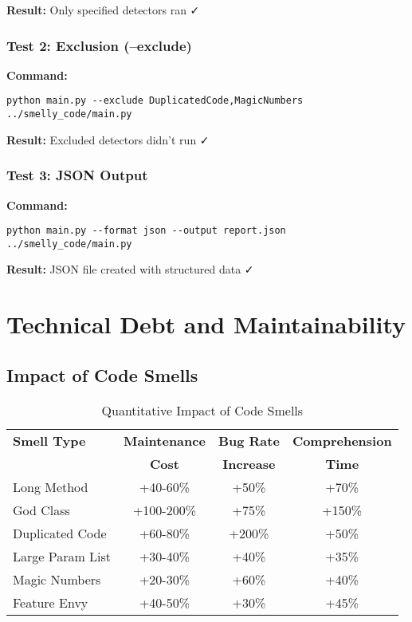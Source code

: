 \documentclass[11pt,a4paper]{article}
\begin{document}
\textbf{Result:} Only specified detectors ran ✓

\subsubsection{Test 2: Exclusion (--exclude)}

\textbf{Command:}
\begin{verbatim}
python main.py --exclude DuplicatedCode,MagicNumbers ../smelly_code/main.py
\end{verbatim}

\textbf{Result:} Excluded detectors didn't run ✓

\subsubsection{Test 3: JSON Output}

\textbf{Command:}
\begin{verbatim}
python main.py --format json --output report.json ../smelly_code/main.py
\end{verbatim}

\textbf{Result:} JSON file created with structured data ✓

\section{Technical Debt and Maintainability}

\subsection{Impact of Code Smells}

\begin{table}[h]
\centering
\caption{Quantitative Impact of Code Smells}
\begin{tabular}{@{}lccc@{}}
\toprule
\textbf{Smell Type} & \textbf{Maintenance} & \textbf{Bug Rate} & \textbf{Comprehension} \\
 & \textbf{Cost} & \textbf{Increase} & \textbf{Time} \\
\midrule
Long Method & +40-60\% & +50\% & +70\% \\
God Class & +100-200\% & +75\% & +150\% \\
Duplicated Code & +60-80\% & +200\% & +50\% \\
Large Param List & +30-40\% & +40\% & +35\% \\
Magic Numbers & +20-30\% & +60\% & +40\% \\
Feature Envy & +40-50\% & +30\% & +45\% \\
\bottomrule
\end{tabular}
\end{table}
\end{document}
